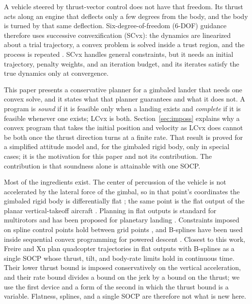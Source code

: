 A vehicle steered by thrust-vector control does not have that freedom. Its thrust acts along an engine that deflects only a
few degrees from the body, and the body is turned by that same deflection. Six-degree-of-freedom (6-DOF) guidance therefore
uses successive convexification (SCvx): the dynamics are linearized about a trial trajectory, a convex problem is solved inside
a trust region, and the process is repeated \cite{mao2016,szmuk2018,szmuk2020}. SCvx handles general constraints, but it needs
an initial trajectory, penalty weights, and an iteration budget, and its iterates satisfy the true dynamics only at convergence.

This paper presents a conservative planner for a gimbaled lander that needs one convex solve, and it states what that
planner guarantees and what it does not. A program is \emph{sound} if it is feasible only when a landing exists and
\emph{complete} if it is feasible whenever one exists; LCvx is both. Section~\ref{sec:imposs} explains why a convex program that
takes the initial position and velocity as LCvx does cannot be both once the thrust direction turns at a finite rate. That
result is proved for a simplified attitude model and, for the gimbaled rigid body, only in special cases; it is the motivation
for this paper and not its contribution. The contribution is that soundness alone is attainable with one SOCP.

Most of the ingredients exist. The center of percussion of the vehicle is not accelerated by the lateral force of the gimbal,
so in that point's coordinates the gimbaled rigid body is differentially flat \cite{fliess1995}; the same point is the flat
output of the planar vertical-takeoff aircraft \cite{martin1996}. Planning in flat outputs is standard for multirotors
\cite{mellinger2011} and has been proposed for planetary landing \cite{desiderio2013}. Constraints imposed on spline control
points hold between grid points \cite{vanloock2015}, and B-splines have been used inside sequential convex programming for
powered descent \cite{wang2026}. Closest to this work, Freire and Xu \cite{freire2023} plan quadcopter trajectories in flat
outputs with B-splines as a single SOCP whose thrust, tilt, and body-rate limits hold in continuous time. Their lower thrust
bound is imposed conservatively on the vertical acceleration, and their rate bound divides a bound on the jerk by a bound on
the thrust; we use the first device and a form of the second in which the thrust bound is a variable. Flatness, splines, and a single SOCP are therefore not what is new here.

